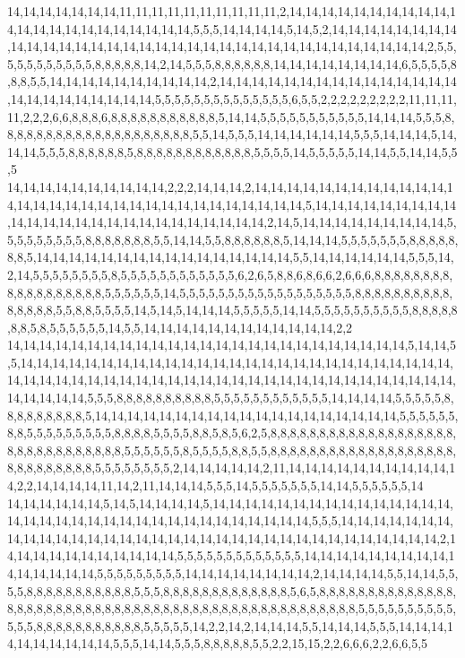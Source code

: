 14,14,14,14,14,14,14,11,11,11,11,11,11,11,11,11,11,2,14,14,14,14,14,14,14,14,14,14,14,14,14,14,14,14,14,14,14,14,14,14,5,5,5,14,14,14,14,5,14,5,2,14,14,14,14,14,14,14,14,14,14,14,14,14,14,14,14,14,14,14,14,14,14,14,14,14,14,14,14,14,14,14,14,14,14,2,5,5,5,5,5,5,5,5,5,5,5,8,8,8,8,8,14,2,14,5,5,5,8,8,8,8,8,8,14,14,14,14,14,14,14,14,6,5,5,5,5,8,8,8,5,5,14,14,14,14,14,14,14,14,14,14,2,14,14,14,14,14,14,14,14,14,14,14,14,14,14,14,14,14,14,14,14,14,14,14,14,5,5,5,5,5,5,5,5,5,5,5,5,5,5,6,5,5,2,2,2,2,2,2,2,2,2,11,11,11,11,2,2,2,6,6,8,8,8,6,8,8,8,8,8,8,8,8,8,8,8,5,14,14,5,5,5,5,5,5,5,5,5,5,5,14,14,14,5,5,5,8,8,8,8,8,8,8,8,8,8,8,8,8,8,8,8,8,8,8,8,5,5,14,5,5,5,14,14,14,14,14,14,5,5,5,14,14,14,5,14,14,14,5,5,5,8,8,8,8,8,8,5,8,8,8,8,8,8,8,8,8,8,8,8,5,5,5,5,14,5,5,5,5,5,14,14,5,5,14,14,5,5,5
14,14,14,14,14,14,14,14,14,14,2,2,2,14,14,14,2,14,14,14,14,14,14,14,14,14,14,14,14,14,14,14,14,14,14,14,14,14,14,14,14,14,14,14,14,14,14,14,5,14,14,14,14,14,14,14,14,14,14,14,14,14,14,14,14,14,14,14,14,14,14,14,14,14,2,14,5,14,14,14,14,14,14,14,14,14,5,5,5,5,5,5,5,5,5,8,8,8,8,8,8,8,5,5,14,14,5,5,8,8,8,8,8,8,5,14,14,14,5,5,5,5,5,5,5,8,8,8,8,8,8,8,5,14,14,14,14,14,14,14,14,14,14,14,14,14,14,14,14,5,5,14,14,14,14,14,14,5,5,5,14,2,14,5,5,5,5,5,5,5,5,8,5,5,5,5,5,5,5,5,5,5,5,5,6,2,6,5,8,8,6,8,6,6,2,6,6,6,8,8,8,8,8,8,8,8,8,8,8,8,8,8,8,8,8,8,5,5,5,5,5,5,14,5,5,5,5,5,5,5,5,5,5,5,5,5,5,5,5,5,5,8,8,8,8,8,8,8,8,8,8,8,8,8,8,8,5,5,8,8,5,5,5,5,14,5,14,5,14,14,14,5,5,5,5,5,14,14,5,5,5,5,5,5,5,5,5,5,8,8,8,8,8,8,8,5,8,5,5,5,5,5,5,14,5,5,14,14,14,14,14,14,14,14,14,14,14,14,2,2
14,14,14,14,14,14,14,14,14,14,14,14,14,14,14,14,14,14,14,14,14,14,14,14,14,5,14,14,5,5,14,14,14,14,14,14,14,14,14,14,14,14,14,14,14,14,14,14,14,14,14,14,14,14,14,14,14,14,14,14,14,14,14,14,14,14,14,14,14,14,14,14,14,14,14,14,14,14,14,14,14,14,14,14,14,14,14,14,14,14,5,5,5,8,8,8,8,8,8,8,8,8,8,5,5,5,5,5,5,5,5,5,5,5,5,14,14,14,14,5,5,5,5,5,8,8,8,8,8,8,8,8,8,5,14,14,14,14,14,14,14,14,14,14,14,14,14,14,14,14,14,14,14,5,5,5,5,5,5,8,8,5,5,5,5,5,5,5,5,5,8,8,8,8,5,5,5,5,8,8,5,8,5,6,2,5,8,8,8,8,8,8,8,8,8,8,8,8,8,8,8,8,8,8,8,8,8,8,8,8,8,8,8,8,8,8,8,5,5,5,5,5,5,8,5,5,5,5,8,8,5,5,8,8,8,8,8,8,8,8,8,8,8,8,8,8,8,8,8,8,8,8,8,8,8,8,8,8,8,8,5,5,5,5,5,5,5,5,2,14,14,14,14,14,2,11,14,14,14,14,14,14,14,14,14,14,14,2,2,14,14,14,14,11,14,2,11,14,14,14,5,5,5,14,5,5,5,5,5,5,5,14,14,5,5,5,5,5,5,14
14,14,14,14,14,14,5,14,5,14,14,14,14,5,14,14,14,14,14,14,14,14,14,14,14,14,14,14,14,14,14,14,14,14,14,14,14,14,14,14,14,14,14,14,14,14,14,14,5,5,5,14,14,14,14,14,14,14,14,14,14,14,14,14,14,14,14,14,14,14,14,14,14,14,14,14,14,14,14,14,14,14,14,14,14,2,14,14,14,14,14,14,14,14,14,14,14,5,5,5,5,5,5,5,5,5,5,5,5,5,14,14,14,14,14,14,14,14,14,14,14,14,14,14,14,5,5,5,5,5,5,5,5,5,14,14,14,14,14,14,14,14,2,14,14,14,14,5,5,14,14,5,5,5,5,8,8,8,8,8,8,8,8,8,8,8,5,5,5,8,8,8,8,8,8,8,8,8,8,8,8,8,5,6,5,8,8,8,8,8,8,8,8,8,8,8,8,8,8,8,8,8,8,8,8,8,8,8,8,8,8,8,8,8,8,8,8,8,8,8,8,8,8,8,8,8,8,8,8,8,8,8,8,8,8,5,5,5,5,5,5,5,5,5,5,5,5,5,8,8,8,8,8,8,8,8,8,8,8,5,5,5,5,5,14,2,2,14,2,14,14,14,5,5,14,14,14,5,5,5,14,14,14,14,14,14,14,14,14,14,5,5,5,14,14,5,5,5,8,8,8,8,8,5,5,2,2,15,15,2,2,6,6,6,2,2,6,6,5,5
